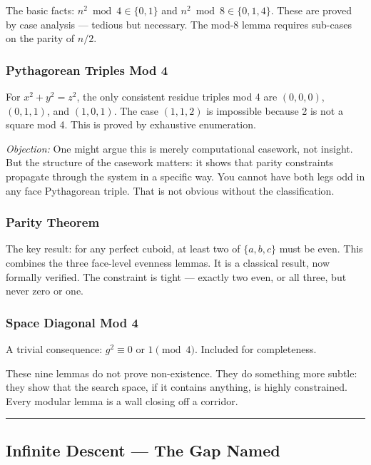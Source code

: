 \documentclass[12pt,a4paper]{article}
\begin{document}
The basic facts: $n^2 \bmod 4 \in \{0, 1\}$ and $n^2 \bmod 8 \in \{0, 1, 4\}$. These are proved by case analysis --- tedious but necessary. The mod-8 lemma requires sub-cases on the parity of $n/2$.

\subsubsection{Pythagorean Triples Mod 4}

For $x^2 + y^2 = z^2$, the only consistent residue triples mod 4 are $(0,0,0)$, $(0,1,1)$, and $(1,0,1)$. The case $(1,1,2)$ is impossible because 2 is not a square mod 4. This is proved by exhaustive enumeration.

\emph{Objection:} One might argue this is merely computational casework, not insight. But the structure of the casework matters: it shows that parity constraints propagate through the system in a specific way. You cannot have both legs odd in any face Pythagorean triple. That is not obvious without the classification.

\subsubsection{Parity Theorem}

The key result: for any perfect cuboid, at least two of $\{a, b, c\}$ must be even. This combines the three face-level evenness lemmas. It is a classical result, now formally verified. The constraint is tight --- exactly two even, or all three, but never zero or one.

\subsubsection{Space Diagonal Mod 4}

A trivial consequence: $g^2 \equiv 0$ or $1 \pmod{4}$. Included for completeness.

These nine lemmas do not prove non-existence. They do something more subtle: they show that the search space, if it contains anything, is highly constrained. Every modular lemma is a wall closing off a corridor.

\begin{center}
\rule{0.5\textwidth}{0.4pt}
\end{center}

\subsection{Infinite Descent --- The Gap Named}
\end{document}
